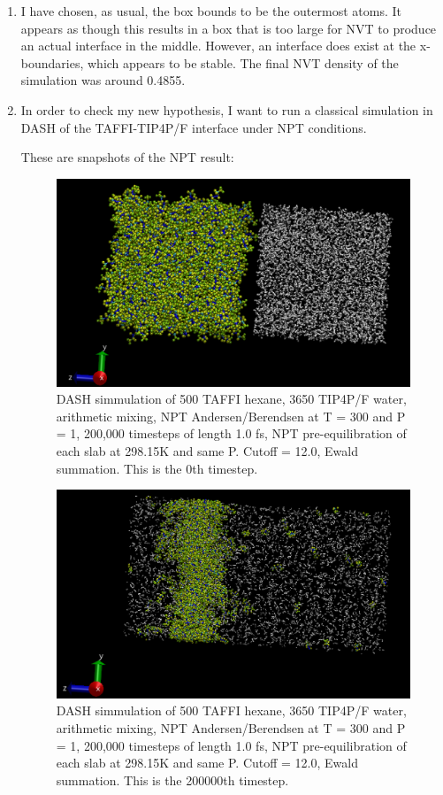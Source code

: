 \documentclass[12pt,reqno]{amsart}
\numberwithin{equation}{section}
\begin{document}
\begin{enumerate}
\item I have chosen, as usual, the box bounds to be the outermost atoms.  It appears as though this results in a box that is too large for NVT to produce an actual interface in the middle.  However, an interface does exist at the x-boundaries, which appears to be stable.  The final NVT density of the simulation was around 0.4855.    

\item In order to check my new hypothesis, I want to run a classical simulation in DASH of the TAFFI-TIP4P/F interface under NPT conditions.  

These are snapshots of the NPT result:

\begin{figure}[H]
\centering
\includegraphics[scale=0.4]{dash_taffi-tip4pF_classical_NPT_0}
\caption{DASH simmulation of 500 TAFFI hexane, 3650 TIP4P/F water, arithmetic mixing, NPT Andersen/Berendsen at T = 300 and P = 1, 200,000 timesteps of length 1.0 fs, NPT pre-equilibration of each slab at 298.15K and same P.  Cutoff = 12.0, Ewald summation.  This is the 0th timestep.}
\end{figure}

\begin{figure}[H]
\centering
\includegraphics[scale=0.4]{dash_taffi-tip4pF_classical_NPT_200000}
\caption{DASH simmulation of 500 TAFFI hexane, 3650 TIP4P/F water, arithmetic mixing, NPT Andersen/Berendsen at T = 300 and P = 1, 200,000 timesteps of length 1.0 fs, NPT pre-equilibration of each slab at 298.15K and same P.  Cutoff = 12.0, Ewald summation.  This is the 200000th timestep.}
\end{figure}


\end{enumerate}
\end{document}
